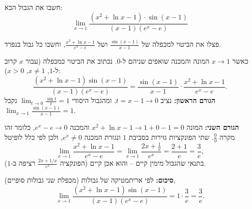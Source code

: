 
\begin{question}
חשבו את הגבול הבא:
\[ \lim_{x\to 1}\frac{(x^2+\ln x-1)\cdot\sin(x-1)}{(x-1)(e^x-e)} \]
\end{question}

\begin{hint}
פצלו את הביטוי למכפלה של $\frac{\sin(x-1)}{x-1}$ ושל $\frac{x^2+\ln x-1}{e^x-e}$, וחשבו כל גבול בנפרד.
\end{hint}

\begin{solution}
כאשר $x\to1$ המונה והמכנה שואפים שניהם ל-$0$. נכתוב את הביטוי כמכפלה (עבור $x$ קרוב ל-$1$, $x\neq1$, $x>0$):
\[ \frac{(x^2+\ln x-1)\sin(x-1)}{(x-1)(e^x-e)}=\frac{\sin(x-1)}{x-1}\cdot\frac{x^2+\ln x-1}{e^x-e}. \]
\textbf{הגורם הראשון:} נציב $t=x-1\to0$, ומהגבול היסודי $\lim_{t\to0}\frac{\sin t}{t}=1$ נקבל $\lim_{x\to1}\frac{\sin(x-1)}{x-1}=1$.

\textbf{הגורם השני:} המונה $x^2+\ln x-1\to 1+0-1=0$ והמכנה $e^x-e\to0$, כלומר זהו מקרה $\frac00$. שתי הפונקציות גזירות בסביבת $1$ ונגזרת המכנה $e^x\neq0$, ולכן לפי כלל לופיטל
\[ \lim_{x\to1}\frac{x^2+\ln x-1}{e^x-e}=\lim_{x\to1}\frac{2x+\frac1x}{e^x}=\frac{2+1}{e}=\frac3e, \]
בתנאי שהגבול מימין קיים -- והוא אכן קיים (הפונקציה $\frac{2x+1/x}{e^x}$ רציפה ב-$1$).

\textbf{סיכום:} לפי אריתמטיקה של גבולות (מכפלת שני גבולות סופיים),
\[ \lim_{x\to 1}\frac{(x^2+\ln x-1)\sin(x-1)}{(x-1)(e^x-e)}=1\cdot\frac3e=\boxed{\frac3e}. \]
\end{solution}
